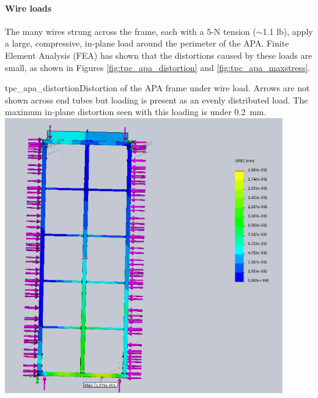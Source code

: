 \paragraph{Wire loads}

The many wires strung across the frame, each with a 5-N tension ($\sim$1.1 lb), apply a large, compressive, in-plane load around the perimeter of the APA.  Finite Element Analysis  (FEA) has shown that the distortions caused by these loads are small, as shown in Figures \ref{fig:tpc_apa_distortion} and \ref{fig:tpc_apa_maxstress}.

\begin{cdrfigure}{tpc_apa_distortion}{Distortion of the APA frame under wire load.  Arrows are not shown across end tubes but loading is present as an evenly distributed load.  The maximum in-plane distortion seen with this loading is under 0.2~mm.}
\includegraphics[width=0.9\textwidth]{figures/tpc_apa_distortion.png} 
\end{cdrfigure}

